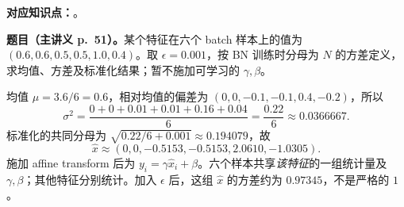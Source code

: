 
\textbf{对应知识点：}。

\textbf{题目（主讲义 p.~51）。}某个特征在六个 batch 样本上的值为 $(0.6,0.6,0.5,0.5,1.0,0.4)$。取 $\epsilon=0.001$，按 BN 训练时分母为 $N$ 的方差定义，求均值、方差及标准化结果；暂不施加可学习的 $\gamma,\beta$。

\begin{workedsolution}
均值 $\mu=3.6/6=0.6$，相对均值的偏差为 $(0,0,-0.1,-0.1,0.4,-0.2)$，所以
\[
 \sigma^2=\frac{0+0+0.01+0.01+0.16+0.04}{6}
 =\frac{0.22}{6}\approx0.0366667.
\]
标准化的共同分母为 $\sqrt{0.22/6+0.001}\approx0.194079$，故
\[
 \boxed{\hat x\approx(0,0,-0.5153,-0.5153,2.0610,-1.0305)}.
\]
施加 affine transform 后为 $y_i=\gamma\hat x_i+\beta$。六个样本共享\emph{该特征}的一组统计量及 $\gamma,\beta$；其他特征分别统计。加入 $\epsilon$ 后，这组 $\hat x$ 的方差约为 $0.97345$，不是严格的 $1$。
\end{workedsolution}
